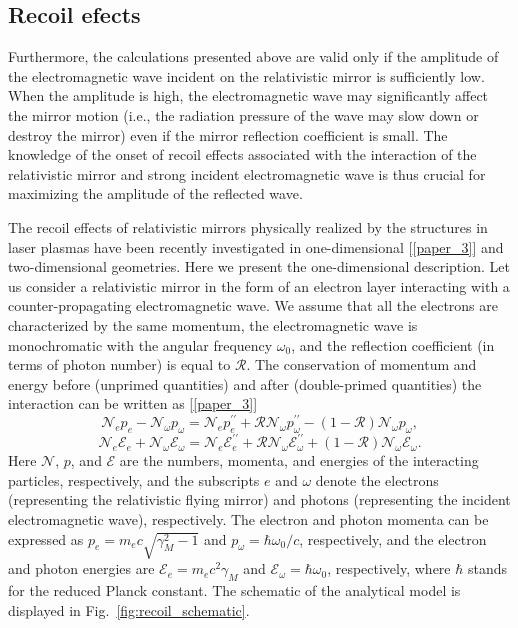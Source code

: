 \documentclass[10pt, a4paper, twoside, openright]{report}
\begin{document}
\subsection{Recoil efects}

Furthermore, the calculations presented above are valid only if the amplitude of the electromagnetic wave incident on the relativistic mirror is sufficiently low. When the amplitude is high, the electromagnetic wave may significantly affect the mirror motion (i.e., the radiation pressure of the wave may slow down or destroy the mirror) even if the mirror reflection coefficient is small. The knowledge of the onset of recoil effects associated with the interaction of the relativistic mirror and strong incident electromagnetic wave is thus crucial for maximizing the amplitude of the reflected wave.

The recoil effects of relativistic mirrors physically realized by the structures in laser plasmas have been recently investigated in one-dimensional [\ref{paper_3}] and two-dimensional \cite{Jeong2021} geometries. Here we present the one-dimensional description. Let us consider a relativistic mirror in the form of an electron layer interacting with a counter-propagating electromagnetic wave. We assume that all the electrons are characterized by the same momentum, the electromagnetic wave is monochromatic with the angular frequency $ \omega_0 $, and the reflection coefficient (in terms of photon number) is equal to $ \mathcal{R} $. The conservation of momentum and energy before (unprimed quantities) and after (double-primed quantities) the interaction can be written as [\ref{paper_3}]
\begin{equation}\label{eq:conservation_of_momentum}
\mathcal{N}_e p_e - \mathcal{N}_{\omega} p_{\omega} = \mathcal{N}_e p_e^{\prime \prime} + \mathcal{R} \mathcal{N}_{\omega} p_{\omega}^{\prime \prime} - \left( 1 - \mathcal{R} \right) \mathcal{N}_{\omega} p_{\omega},
\end{equation}
\begin{equation}\label{eq:conservation_of_energy}
\mathcal{N}_e \mathcal{E}_e + \mathcal{N}_{\omega} \mathcal{E}_{\omega} = \mathcal{N}_e \mathcal{E}_e^{\prime \prime} + \mathcal{R} \mathcal{N}_{\omega} \mathcal{E}_{\omega}^{\prime \prime} + \left( 1 - \mathcal{R} \right) \mathcal{N}_{\omega}  \mathcal{E}_{\omega}.
\end{equation}
Here $ \mathcal{N} $, $ p $, and $ \mathcal{E} $ are the numbers, momenta, and energies of the interacting particles, respectively, and the subscripts $ e $ and $ \omega $ denote the electrons (representing the relativistic flying mirror) and photons (representing the incident electromagnetic wave), respectively. The electron and photon momenta can be expressed as $ p_e = m_e c \sqrt{\gamma_M^2 - 1} $ and $ p_{\omega} = \hbar \omega_0 / c $, respectively, and the electron and photon energies are $ \mathcal{E}_e = m_e c^2 \gamma_M $ and $ \mathcal{E}_{\omega} = \hbar \omega_0 $, respectively, where $ \hbar $ stands for the reduced Planck constant. The schematic of the analytical model is displayed in Fig.~\ref{fig:recoil_schematic}.
\end{document}

